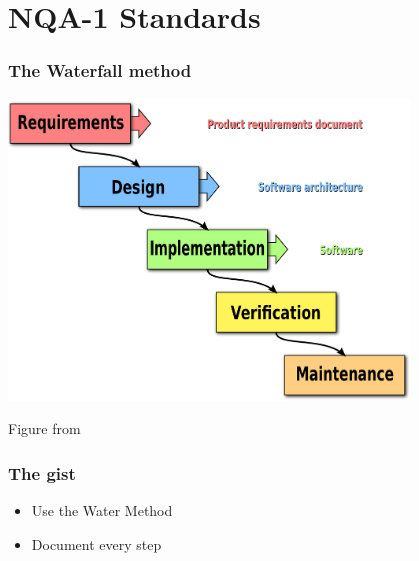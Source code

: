 \documentclass[12pt]{beamer}
\begin{document}
\section{NQA-1 Standards}

\begin{frame}[fragile]
\frametitle{The Waterfall method \cite{waterfall}}
\centerline{\includegraphics[width=0.8\textwidth]{figures/waterfall.pdf}}
Figure from \cite{waterfall_wiki}
\end{frame}


\begin{frame}
\frametitle{The gist}

\begin{itemize}
\item{Use the Water Method}
\item{Document every step}
\end{itemize}

\end{frame}
\end{document}
